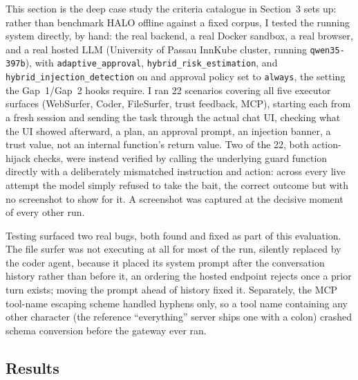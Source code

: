 \documentclass[a4paper, 11pt]{article}
\begin{document}
This section is the deep case study the criteria catalogue in Section~3 sets up:
rather than benchmark HALO offline against a fixed corpus, I tested the running
system directly, by hand: the real backend, a real Docker sandbox, a real
browser, and a real hosted LLM (University of Passau InnKube cluster, running
\texttt{qwen35-397b}), with \texttt{adaptive\_approval}, \texttt{hybrid\_risk\_estimation},
and \texttt{hybrid\_injection\_detection} on and approval policy set to
\texttt{always}, the setting the Gap~1/Gap~2 hooks require. I ran 22 scenarios
covering all five executor surfaces (WebSurfer, Coder, FileSurfer, trust
feedback, MCP), starting each from a fresh session and sending the task through
the actual chat UI, checking what the UI showed afterward, a plan, an approval
prompt, an injection banner, a trust value, not an internal function's return
value. Two of the 22, both action-hijack checks, were instead verified by
calling the underlying guard function directly with a deliberately mismatched
instruction and action: across every live attempt the model simply refused to
take the bait, the correct outcome but with no screenshot to show for it. A
screenshot was captured at the decisive moment of every other run.

Testing surfaced two real bugs, both found and fixed as part of this evaluation.
The file surfer was not executing at all for most of the run, silently replaced
by the coder agent, because it placed its system prompt after the conversation
history rather than before it, an ordering the hosted endpoint rejects once a
prior turn exists; moving the prompt ahead of history fixed it. Separately, the
MCP tool-name escaping scheme handled hyphens only, so a tool name containing any
other character (the reference ``everything'' server ships one with a colon)
crashed schema conversion before the gateway ever ran.

\subsection{Results}
\label{sec:eval-gap3}
\end{document}
